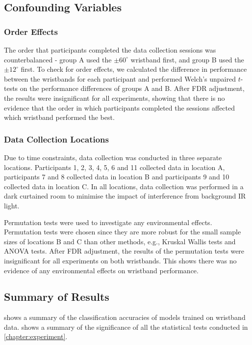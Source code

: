 \documentclass[ oneside,%
                    author={Jack Jarvis},
                    degree={BSc},
                     title={FlexIR: Flexible PCB Wristbands for Infrared Based Gesture Recognition},
                    unit={COMS30045},
                    subtitle={Investigating the Effect of LED Viewing Angle on Gesture Classification in Infrared Sensing Systems}]{dissertation}
\begin{document}
\subsection{Confounding Variables}
\label{sec:confounding_variables}
\subsubsection{Order Effects}
The order that participants completed the data collection sessions was counterbalanced - group A used the $\pm 60^\circ$ wristband first, and group B used the $\pm 12^\circ$ first. To check for order effects, we calculated the difference in performance between the wristbands for each participant and performed Welch's unpaired $t$-tests on the performance differences of groups A and B. After FDR adjustment, the results were insignificant for all experiments, showing that there is no evidence that the order in which participants completed the sessions affected which wristband performed the best.


\subsubsection{Data Collection Locations}
Due to time constraints, data collection was conducted in three separate locations. Participants 1, 2, 3, 4, 5, 6 and 11 collected data in location A, participants 7 and 8 collected data in location B and participants 9 and 10 collected data in location C. In all locations, data collection was performed in a dark curtained room to minimise the impact of interference from background IR light.

Permutation tests were used to investigate any environmental effects. Permutation tests were chosen since they are more robust for the small sample sizes of locations B and C than other methods, e.g., Kruskal Wallis tests and ANOVA tests. After FDR adjustment, the results of the permutation tests were insignificant for all experiments on both wristbands. This shows there was no evidence of any environmental effects on wristband performance.

\subsection{Summary of Results}
 shows a summary of the classification accuracies of models trained on wristband data.  shows a summary of the significance of all the statistical tests conducted in \cref{chapter:experiment}.
\end{document}
